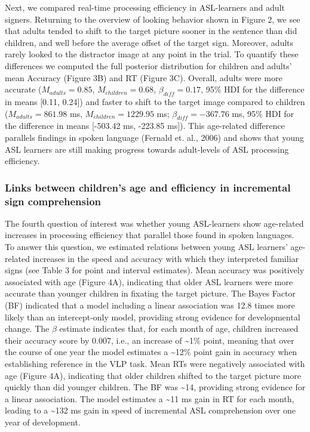 \documentclass[oneside]{report}
\begin{document}
Next, we compared real-time processing efficiency in ASL-learners and
adult signers. Returning to the overview of looking behavior shown in
Figure 2, we see that adults tended to shift to the target picture
sooner in the sentence than did children, and well before the average
offset of the target sign. Moreover, adults rarely looked to the
distractor image at any point in the trial. To quantify these
differences we computed the full posterior distribution for children and
adults' mean Accuracy (Figure 3B) and RT (Figure 3C). Overall, adults
were more accurate (\(M_{adults}= 0.85\), \(M_{children} = 0.68\),
\(\beta_{diff} = 0.17\), 95\% HDI for the difference in means {[}0.11,
0.24{]}) and faster to shift to the target image compared to children
(\(M_{adults}= 861.98\) ms, \(M_{children} = 1229.95\) ms;
\(\beta_{diff} = -367.76\) ms, 95\% HDI for the difference in means
{[}-503.42 ms, -223.85 ms{]}). This age-related difference parallels
findings in spoken language (Fernald et. al., 2006) and shows that young
ASL learners are still making progress towards adult-levels of ASL
processing efficiency.

\subsubsection{Links between children's age and efficiency in
incremental sign
comprehension}\label{links-between-childrens-age-and-efficiency-in-incremental-sign-comprehension}

The fourth question of interest was whether young ASL-learners show
age-related increases in processing efficiency that parallel those found
in spoken languages. To answer this question, we estimated relations
between young ASL learners' age-related increases in the speed and
accuracy with which they interpreted familiar signs (see Table 3 for
point and interval estimates). Mean accuracy was positively associated
with age (Figure 4A), indicating that older ASL learners were more
accurate than younger children in fixating the target picture. The Bayes
Factor (BF) indicated that a model including a linear association was
12.8 times more likely than an intercept-only model, providing strong
evidence for developmental change. The \(\beta\) estimate indicates
that, for each month of age, children increased their accuracy score by
0.007, i.e., an increase of \textasciitilde{}1\% point, meaning that
over the course of one year the model estimates a \textasciitilde{}12\%
point gain in accuracy when establishing reference in the VLP task. Mean
RTs were negatively associated with age (Figure 4A), indicating that
older children shifted to the target picture more quickly than did
younger children. The BF was \textasciitilde{}14, providing strong
evidence for a linear association. The model estimates a
\textasciitilde{}11 ms gain in RT for each month, leading to a
\textasciitilde{}132 ms gain in speed of incremental ASL comprehension
over one year of development.
\end{document}
